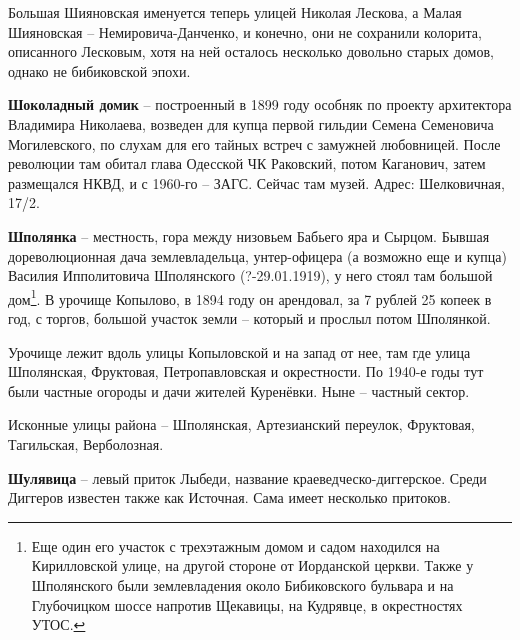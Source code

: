 Большая Шияновская именуется теперь улицей Николая Лескова, а Малая Шияновская – Немировича-Данченко, и конечно, они не сохранили колорита, описанного Лесковым, хотя на ней осталось несколько довольно старых домов, однако не бибиковской эпохи.\\

\medskip

\textbf{Шоколадный домик} – построенный в 1899 году особняк по проекту архитектора Владимира Николаева, возведен для купца первой гильдии Семена Семеновича Могилевского, по слухам для его тайных встреч с замужней любовницей. После революции там обитал глава Одесской ЧК Раковский, потом Каганович, затем размещался НКВД, и с 1960-го – ЗАГС. Сейчас там музей. Адрес: Шелковичная, 17/2.\\

\medskip

\textbf{Шполянка} – местность, гора между низовьем Бабьего яра и Сырцом. Бывшая дореволюционная дача землевладельца, унтер-офицера (а возможно еще и купца) Василия Ипполитовича Шполянского (?-29.01.1919), у него стоял там большой дом\footnote{Еще один его участок с трехэтажным домом и садом находился на Кирилловской улице, на другой стороне от Иорданской церкви. Также у Шполянского были землевладения около Бибиковского бульвара и на Глубочицком шоссе напротив Щекавицы, на Кудрявце, в окрестностях УТОС.}. В урочище Копылово, в 1894 году он арендовал, за 7 рублей 25 копеек в год, с торгов, большой участок земли – который и прослыл потом Шполянкой.

Урочище лежит вдоль улицы Копыловской и на запад от нее, там где улица Шполянская, Фруктовая, Петропавловская и окрестности. По 1940-е годы тут были частные огороды и дачи жителей Куренёвки. Ныне – частный сектор.

Исконные улицы района – Шполянская, Артезианский переулок, Фруктовая, Тагильская, Верболозная.\\

\medskip

\textbf{Шулявица} – левый приток Лыбеди, название краеведческо-диггерское. Среди Диггеров известен также как Источная. Сама имеет нес\-колько притоков.

